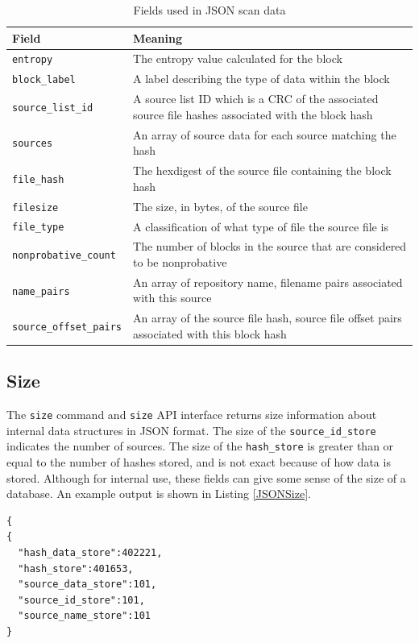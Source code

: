 \documentclass[11pt,fleqn]{article} %
\begin{document}
\begin{table}[!ht]

\centering
\caption{Fields used in JSON scan data}
\label{tab:JSONScanData}
\begin{tabular}{|p{5 cm}|p{8.8 cm}|}
\hline \hline
\textbf{Field} & \textbf{Meaning} \\
\hline
\verb+entropy+ & The entropy value calculated for the block\\
\hline
\verb+block_label+ & A label describing the type of data within the block\\
\hline
\verb+source_list_id+ & A source list ID which is a CRC of the associated source file hashes associated with the block hash\\
\hline
\verb+sources+ & An array of source data for each source matching the hash\\
\hline
\verb+file_hash+ & The hexdigest of the source file containing the block hash\\
\hline
\verb+filesize+ & The size, in bytes, of the source file\\
\hline
\verb+file_type+ & A classification of what type of file the source file is\\
\hline
\verb+nonprobative_count+ & The number of blocks in the source that are considered to be nonprobative\\
\hline
\verb+name_pairs+ & An array of repository name, filename pairs associated with this source\\
\hline
\verb+source_offset_pairs+ & An array of the source file hash, source file offset pairs associated with this block hash\\
\hline
\end{tabular}
\end{table}

\subsection{Size}
The \hdb \verb+size+ command and \verb+size+ API interface returns size information about internal data structures in JSON format. The size of the \verb+source_id_store+ indicates the number of sources. The size of the \verb+hash_store+ is greater than or equal to the number of hashes stored, and is not exact because of how data is stored. Although for internal use, these fields can give some sense of the size of a \hdb database. An example output is shown in Listing \ref{JSONSize}.\\

\lstset{style=customfile}
\begin{lstlisting}[float, caption={Example JSON output of database size values}, label=JSONSize]
{
{
  "hash_data_store":402221,
  "hash_store":401653,
  "source_data_store":101,
  "source_id_store":101,
  "source_name_store":101
}
\end{lstlisting}
\end{document}
